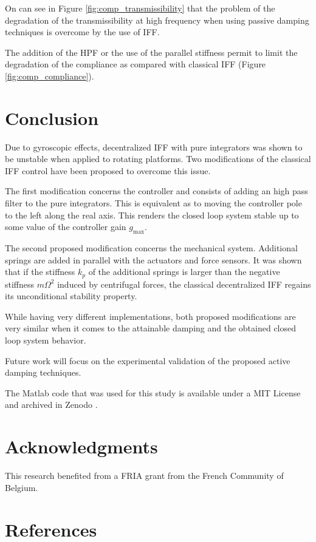 \documentclass[10pt]{iopart}
\begin{document}
On can see in Figure \ref{fig:comp_transmissibility} that the problem of the degradation of the transmissibility at high frequency when using passive damping techniques is overcome by the use of IFF.

The addition of the HPF or the use of the parallel stiffness permit to limit the degradation of the compliance as compared with classical IFF (Figure \ref{fig:comp_compliance}).

\section{Conclusion}
\label{sec:org3e5d606}
\label{sec:conclusion}

Due to gyroscopic effects, decentralized IFF with pure integrators was shown to be unstable when applied to rotating platforms.
Two modifications of the classical IFF control have been proposed to overcome this issue.

The first modification concerns the controller and consists of adding an high pass filter to the pure integrators.
This is equivalent as to moving the controller pole to the left along the real axis.
This renders the closed loop system stable up to some value of the controller gain \(g_\text{max}\).

The second proposed modification concerns the mechanical system.
Additional springs are added in parallel with the actuators and force sensors.
It was shown that if the stiffness \(k_p\) of the additional springs is larger than the negative stiffness \(m \Omega^2\) induced by centrifugal forces, the classical decentralized IFF regains its unconditional stability property.

While having very different implementations, both proposed modifications are very similar when it comes to the attainable damping and the obtained closed loop system behavior.

Future work will focus on the experimental validation of the proposed active damping techniques.

The Matlab code that was used for this study is available under a MIT License and archived in Zenodo \cite{dehaeze20_activ_dampin_rotat_posit_platf}.

\section*{Acknowledgments}
\label{sec:org2fdf2e5}
This research benefited from a FRIA grant from the French Community of Belgium.

\section*{References}
\label{sec:org684d4d0}


\end{document}
